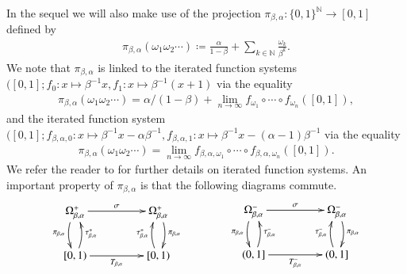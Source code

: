 \documentclass[a4paper,reqno,10pt]{amsart}
\begin{document}
In the sequel we will also make use of the projection $\pi_{\beta, \alpha} \colon \{ 0, 1 \}^{\mathbb{N}} \to [0, 1]$ defined by
    \begin{align*}
        \pi_{\beta, \alpha}(\omega_{1} \omega_{2} \cdots) \coloneqq \frac{\alpha}{1 - \beta} + \sum_{k \in \mathbb{N}} \frac{\omega_{k}}{\beta^k}.
    \end{align*}
We note that $\pi_{\beta, \alpha}$ is linked to the iterated function systems $( [0, 1]; f_{0} \colon x \mapsto \beta^{-1}x, f_{1} \colon x \mapsto \beta^{-1}(x+1)$ via the equality
    \begin{align*}
        \pi_{\beta, \alpha}(\omega_{1} \omega_{2} \cdots)
        = \alpha / (1-\beta) + \lim_{n \to \infty} f_{\omega_{1}} \circ \cdots \circ f_{\omega_{n}}([0, 1]),
    \end{align*}
and the iterated function system $( [0, 1]; f_{\beta, \alpha, 0} \colon x \mapsto \beta^{-1}x - \alpha\beta^{-1}, f_{\beta, \alpha, 1} \colon x \mapsto \beta^{-1}x - (\alpha-1)\beta^{-1}$ via the equality
    \begin{align}\label{eq:alt_IFS}
        \pi_{\beta, \alpha}(\omega_{1} \omega_{2} \cdots)
        =\lim_{n \to \infty} f_{\beta,\alpha,\omega_{1}} \circ \cdots \circ f_{\beta,\alpha,\omega_{n}}([0, 1]).
    \end{align}
We refer the reader to \cite{F:1990} for further details on iterated function systems. An important property of $\pi_{\beta, \alpha}$ is that the following diagrams commute.
	\begin{align}\label{eq:commutative_diag}
	    \begin{aligned}
            \xymatrix@C+2pc{
            \Omega^{+}_{\beta, \alpha}
            \ar@/_/[d]_{\pi_{\beta, \alpha}}
            \ar[r]^{\sigma} & 
            \Omega_{\beta, \alpha}^{+}
            \ar@/^/[d]^{\pi_{\beta, \alpha}} \\
            {[0, 1)}
            \ar@/_/[u]_{\tau_{\beta,\alpha}^{+}}
            \ar[r]_{T_{\beta, \alpha}}  & 
            \ar@/^/[u]^{\tau_{\beta,\alpha}^{+}}
            [0, 1)}
	    \end{aligned}
	    \qquad\qquad
	    \begin{aligned}
            \xymatrix@C+2pc{
            \Omega^{-}_{\beta, \alpha}
            \ar@/_/[d]_{\pi_{\beta, \alpha}}
            \ar[r]^{\sigma} & 
            \Omega_{\beta, \alpha}^{-}
            \ar@/^/[d]^{\pi_{\beta, \alpha}} \\
            {(0, 1]}
            \ar@/_/[u]_{\tau_{\beta,\alpha}^{-}}
            \ar[r]_{T^{-}_{\beta, \alpha}}  & 
            \ar@/^/[u]^{\tau_{\beta,\alpha}^{-}}
            (0, 1]}
	    \end{aligned}
	\end{align}
\end{document}
